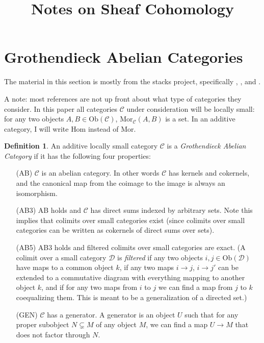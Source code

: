 \documentclass[letterpaper,11pt]{article}
\theoremstyle{definition}
\newtheorem{defn}{Definition}
\theoremstyle{remark}
\begin{document}
\newcommand{\CC}{\mathbb{C}}
\newcommand{\RR}{\mathbb{R}}

\title{Notes on Sheaf Cohomology}
\date{}
\maketitle

\tableofcontents

\section{Grothendieck Abelian Categories}

The material in this section is mostly from the stacks project, specifically \cite[\href{http://stacks.math.columbia.edu/tag/05NM}{Tag 05NM}]{stacks-project}, \cite[\href{http://stacks.math.columbia.edu/tag/079A}{Tag 079A}]{stacks-project}, and \cite[\href{http://stacks.math.columbia.edu/tag/05AB}{Tag 05AB}]{stacks-project}.

A note: most references are not up front about what type of categories they consider. In this paper all categories $\mathcal{C}$ under consideration will be locally small: for any two objects $A,B\in \mbox{Ob}(\mathcal{C})$, $\mbox{Mor}_\mathcal{C}(A,B)$ is a set. In an additive category, I will write $\mbox{Hom}$ instead of $\mbox{Mor}$.

\begin{defn} An additive locally small category $\mathcal{C}$ is a \emph{Grothendieck Abelian Category} if it has the following four properties:
\begin{itemize}
\item[(AB)] $\mathcal{C}$ is an abelian category. In other words $\mathcal{C}$ has kernels and cokernels, and the canonical map from the coimage to the image is always an isomorphism.

\item[(AB3)] AB holds and $\mathcal{C}$ has direct sums indexed by arbitrary sets. Note this implies that colimits over small categories exist (since colimits over small categories can be written as cokernels of direct sums over sets).

\item[(AB5)] AB3 holds and filtered colimits over small categories are exact. (A colimit over a small category $\mathcal{D}$ is \emph{filtered} if any two objects $i,j\in \mbox{Ob}(\mathcal{D})$ have maps to a common object $k$, if any two maps $i\rightarrow j$, $i\rightarrow j'$ can be extended to a commutative diagram with everything mapping to another object $k$, and if for any two maps from $i$ to $j$ we can find a map from $j$ to $k$ coequalizing them. This is meant to be a generalization of a directed set.)

\item[(GEN)] $\mathcal{C}$ has a generator. A generator is an object $U$ such that for any proper subobject $N \subsetneq M$ of any object $M$, we can find a map $U\rightarrow M$ that does not factor through $N$.
\end{itemize}
\end{defn}
\end{document}
